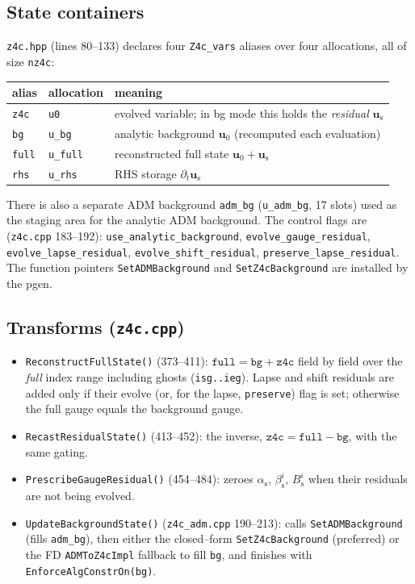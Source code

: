 \documentclass[11pt]{article}
\newcommand{\code}[1]{\texttt{#1}}
\newcommand{\file}[1]{\texttt{#1}}
\newcommand{\bg}[1]{#1_{0}}
\newcommand{\res}[1]{#1_{\mathrm s}}
\begin{document}
\subsection{State containers}
\file{z4c.hpp} (lines 80--133) declares four \code{Z4c\_vars} aliases over four
allocations, all of size \code{nz4c}:
\begin{center}
\begin{tabular}{lll}
\toprule
alias & allocation & meaning \\
\midrule
\code{z4c} & \code{u0} & evolved variable; in bg mode this holds the \emph{residual} $\res{\bm u}$\\
\code{bg}  & \code{u\_bg} & analytic background $\bg{\bm u}$ (recomputed each evaluation)\\
\code{full}& \code{u\_full} & reconstructed full state $\bg{\bm u}+\res{\bm u}$\\
\code{rhs} & \code{u\_rhs} & RHS storage $\partial_t\res{\bm u}$\\
\bottomrule
\end{tabular}
\end{center}
There is also a separate ADM background \code{adm\_bg} (\code{u\_adm\_bg}, 17
slots) used as the staging area for the analytic ADM background. The control
flags are (\file{z4c.cpp} 183--192):
\code{use\_analytic\_background}, \code{evolve\_gauge\_residual},
\code{evolve\_lapse\_residual}, \code{evolve\_shift\_residual},
\code{preserve\_lapse\_residual}. The function pointers
\code{SetADMBackground} and \code{SetZ4cBackground} are installed by the pgen.

\subsection{Transforms (\file{z4c.cpp})}
\begin{itemize}[leftmargin=1.4em,itemsep=2pt]
\item \code{ReconstructFullState()} (373--411): $\code{full}=\code{bg}+\code{z4c}$
field by field over the \emph{full} index range including ghosts
(\code{isg..ieg}). Lapse and shift residuals are added only if their evolve
(or, for the lapse, \code{preserve}) flag is set; otherwise the full gauge
equals the background gauge.
\item \code{RecastResidualState()} (413--452): the inverse,
$\code{z4c}=\code{full}-\code{bg}$, with the same gating.
\item \code{PrescribeGaugeResidual()} (454--484): zeroes $\res\alpha$,
$\res\beta^i$, $\res B^i$ when their residuals are not being evolved.
\item \code{UpdateBackgroundState()} (\file{z4c\_adm.cpp} 190--213): calls
\code{SetADMBackground} (fills \code{adm\_bg}), then either the closed--form
\code{SetZ4cBackground} (preferred) or the FD \code{ADMToZ4cImpl} fallback to
fill \code{bg}, and finishes with \code{EnforceAlgConstrOn(bg)}.
\end{itemize}
\end{document}
